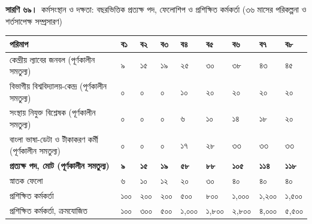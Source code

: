 \documentclass[border=10pt]{standalone}
\begin{document}
\begin{minipage}{22cm}
{\large\bfseries সারণি ৬৯।}\ {\large কর্মসংস্থান ও দক্ষতা: বছরভিত্তিক প্রত্যক্ষ পদ, ফেলোশিপ ও প্রশিক্ষিত কর্মকর্তা (৩৬ মাসের পরিকল্পনা ও শর্তসাপেক্ষ সম্প্রসারণ)}\par\vspace{7pt}
\small
{}
\begin{tabularx}{\linewidth}{@{}>{\hsize=2.872\hsize\raggedright\arraybackslash}X>{\hsize=0.766\hsize\raggedright\arraybackslash}X>{\hsize=0.766\hsize\raggedright\arraybackslash}X>{\hsize=0.766\hsize\raggedright\arraybackslash}X>{\hsize=0.766\hsize\raggedright\arraybackslash}X>{\hsize=0.766\hsize\raggedright\arraybackslash}X>{\hsize=0.766\hsize\raggedright\arraybackslash}X>{\hsize=0.766\hsize\raggedright\arraybackslash}X>{\hsize=0.766\hsize\raggedright\arraybackslash}X@{}}
\arrayrulecolor{bapilrule}\toprule
\rowcolor{white}\textbf{পরিমাপ} & \textbf{ব১} & \textbf{ব২} & \textbf{ব৩} & \textbf{ব৪} & \textbf{ব৫} & \textbf{ব৬} & \textbf{ব৭} & \textbf{ব৮} \\
\midrule
কেন্দ্রীয় ল্যাবের জনবল (পূর্ণকালীন সমতুল্য) & ৯ & ১৫ & ১৯ & ২৫ & ৩০ & ৩৮ & ৪৩ & ৪৫ \\
বিভাগীয় বিশ্ববিদ্যালয়-কেন্দ্র (পূর্ণকালীন সমতুল্য) & ০ & ০ & ০ & ১০ & ২০ & ২০ & ২০ & ২০ \\
সংস্থায় নিযুক্ত বিশ্লেষক (পূর্ণকালীন সমতুল্য) & ০ & ০ & ০ & ৬ & ১০ & ১৪ & ১৮ & ২০ \\
বাংলা ভাষা-ডেটা ও টীকাকরণ কর্মী (পূর্ণকালীন সমতুল্য) & ০ & ০ & ০ & ১৭ & ২৮ & ৩৩ & ৩৩ & ৩৩ \\
\textbf{প্রত্যক্ষ পদ, মোট (পূর্ণকালীন সমতুল্য)} & \textbf{৯} & \textbf{১৫} & \textbf{১৯} & \textbf{৫৮} & \textbf{৮৮} & \textbf{১০৫} & \textbf{১১৪} & \textbf{১১৮} \\
স্নাতক ফেলো & ৬ & ১০ & ১২ & ২০ & ৩০ & ৪০ & ৪০ & ৪০ \\
প্রশিক্ষিত কর্মকর্তা & ১০০ & ২০০ & ২০০ & ৫০০ & ৮০০ & ১,০০০ & ১,২০০ & ১,৫০০ \\
প্রশিক্ষিত কর্মকর্তা, ক্রমযোজিত & ১০০ & ৩০০ & ৫০০ & ১,০০০ & ১,৮০০ & ২,৮০০ & ৪,০০০ & ৫,৫০০ \\
\bottomrule
\end{tabularx}
\par{}
\par{}
\end{minipage}
\end{document}
